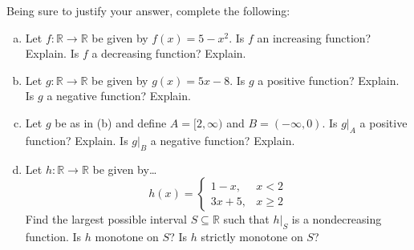 \documentclass[11pt,letterpaper]{article}
\begin{document}
\newpage



 Being sure to justify your answer, complete the following:
	\begin{enumerate}[(a)]
	\item Let $f: \mathbb{R} \to \mathbb{R}$ be given by $f(x)= 5 - x^2$. Is $f$ an increasing function? Explain. Is $f$ a decreasing function? Explain. 
	\item Let $g: \mathbb{R} \to \mathbb{R}$ be given by $g(x)= 5x - 8$. Is $g$ a positive function? Explain. Is $g$ a negative function? Explain. 
	\item Let $g$ be as in (b) and define $A= [2, \infty)$ and $B= (-\infty, 0)$. Is $g \big|_A$ a positive function? Explain. Is $g \big|_B$ a negative function? Explain. 
	\item Let $h: \mathbb{R} \to \mathbb{R}$ be given by\dots
		\[
		h(x)= 
		\begin{cases}
		1 - x, & x < 2 \\
		3x + 5, & x \geq 2
		\end{cases}
		\]
	Find the largest possible interval $S \subseteq \mathbb{R}$ such that $h \big|_S$ is a nondecreasing function. Is $h$ monotone on $S$? Is $h$ strictly monotone on $S$?
	\end{enumerate}
\end{document}
